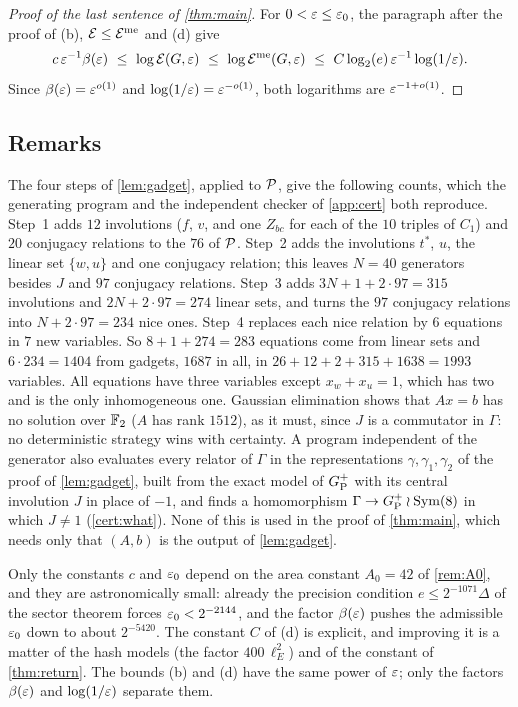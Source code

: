 \begin{proof}[Proof of the last sentence of \cref{thm:main}]
For $0<\varepsilon\le\varepsilon_0$, the paragraph after the proof of (b), $\mathcal E\le\mathcal E^{\mathrm{me}}$ and (d) give
\[
c\,\eps^{-1}\bfun(\eps)\ \le\ \log\Ent(G,\eps)\ \le\ \log\Entme(G,\eps)\ \le\ C\log_2(e)\,\eps^{-1}\log(1/\eps).
\]
Since $\beta(\varepsilon)=\varepsilon^{o(1)}$ and $\log(1/\varepsilon)=\varepsilon^{-o(1)}$, both logarithms are $\varepsilon^{-1+o(1)}$.
\end{proof}

\subsection{Remarks}

\begin{remark}\label{rem:game-size}
The four steps of \cref{lem:gadget}, applied to $\mathcal P$, give the following counts, which the generating program and the independent
checker of \cref{app:cert} both reproduce. Step~1 adds $12$ involutions ($f$, $v$, and one $Z_{bc}$ for each of the $10$ triples of $C_1$)
and $20$ conjugacy relations to the $76$ of $\mathcal P$. Step~2 adds the involutions $t^*$, $u$, the linear set $\{w,u\}$ and one conjugacy
relation; this leaves $N=40$ generators besides $J$ and $97$ conjugacy relations. Step~3 adds $3N+1+2\cdot97=315$ involutions and
$2N+2\cdot97=274$ linear sets, and turns the $97$ conjugacy relations into $N+2\cdot97=234$ nice ones. Step~4 replaces each nice relation
by $6$ equations in $7$ new variables. So $8+1+274=283$ equations come from linear sets and $6\cdot234=1404$ from gadgets, $1687$ in all,
in $26+12+2+315+1638=1993$ variables. All equations have three variables except $x_w+x_u=1$, which has two and is the only inhomogeneous
one. Gaussian elimination shows that $Ax=b$ has no solution over $\mathbb F_2$ ($A$ has rank $1512$), as it must, since $J$ is a commutator in
$\Gamma$: no deterministic strategy wins with certainty. A program independent of the generator also evaluates every relator of $\Gamma$ in
the representations $\gamma,\gamma_1,\gamma_2$ of the proof of \cref{lem:gadget}, built from the exact model of $G_{\mathrm P}^{+}$ with its central
involution $J$ in place of $-1$, and finds a homomorphism $\Gamma\to G_{\mathrm P}^{+}\wr\operatorname{Sym}(8)$ in which $J\ne1$ (\cref{cert:what}). None of this is used
in the proof of \cref{thm:main}, which needs only that $(A,b)$ is the output of \cref{lem:gadget}.
\end{remark}

\begin{remark}\label{game:constants}
Only the constants $c$ and $\varepsilon_0$ depend on the area constant $A_0=42$ of \cref{rem:A0}, and they are astronomically small: already
the precision condition $e\le2^{-1071}\Delta$ of the sector theorem forces $\varepsilon_0<2^{-2144}$, and the factor $\beta(\varepsilon)$ pushes the
admissible $\varepsilon_0$ down to about $2^{-5420}$. The constant $C$ of (d) is explicit, and
improving it is a matter of the hash models (the factor $400\,\ell_E^2$) and of the constant of \cref{thm:return}. The bounds (b) and (d) have
the same power of $\varepsilon$; only the factors $\beta(\varepsilon)$ and $\log(1/\varepsilon)$ separate them.
\end{remark}

